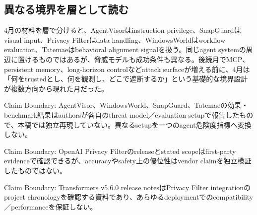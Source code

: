 \subsection{異なる境界を層として読む}

4月の材料を層で分けると、AgentVisorはinstruction privilege、SnapGuardはvisual input、Privacy Filterはdata handling、WindowsWorldはworkflow evaluation、Tatemaeはbehavioral alignment signalを扱う。同じagent systemの周辺に置けるものではあるが、脅威モデルも成功条件も異なる。後続月でMCP、persistent memory、long-horizon controlなどattack surfaceが増える前に、4月は「何をtrustedとし、何を観測し、どこで遮断するか」という基礎的な境界設計が複数方向から現れた月だった。\autocite{src-3efc4342b784,src-477d406be59c,src-73ae4b975e7b,src-8cf1b0dc8361,src-a408165af133}


\begin{claimboundary}
Claim Boundary: AgentVisor、WindowsWorld、SnapGuard、Tatemaeの効果・benchmark結果はauthorsが各自のthreat model／evaluation setupで報告したもので、本稿では独立再現していない。異なるsetupを一つのagent危険度指標へ変換しない。\autocite{src-477d406be59c,src-73ae4b975e7b,src-8cf1b0dc8361,src-a408165af133}
\end{claimboundary}

\begin{claimboundary}
Claim Boundary: OpenAI Privacy Filterのreleaseとstated scopeはfirst-party evidenceで確認できるが、accuracyやsafety上の優位性はvendor claimを独立検証したものではない。\autocite{src-3efc4342b784}
\end{claimboundary}

\begin{claimboundary}
Claim Boundary: Transformers v5.6.0 release notesはPrivacy Filter integrationのproject chronologyを確認する資料であり、あらゆるdeploymentでのcompatibility／performanceを保証しない。\autocite{src-2f8952da2dc3}
\end{claimboundary}

